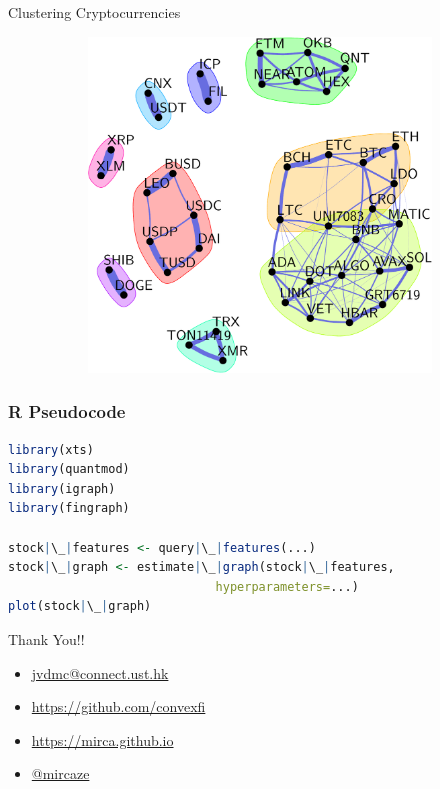 \documentclass[aspectratio=169]{beamer}
\begin{document}
\begin{frame}{Clustering Cryptocurrencies}
  \pause
    \vspace{.75cm}
    \begin{figure}[!htb]
    \captionsetup[subfigure]{justification=centering}
    \centering
    \begin{subfigure}[t]{0.99\textwidth}
        \centering
        \includegraphics[scale=0.38]{figures/crypto-45-crop.pdf}
    \end{subfigure}%
   \end{figure}
\end{frame}

\begin{frame}[fragile]
\frametitle{R Pseudocode}
\begin{lstlisting}[language=R]
library(xts)
library(quantmod)
library(igraph)
library(fingraph)

stock|\_|features <- query|\_|features(...)
stock|\_|graph <- estimate|\_|graph(stock|\_|features,
                             hyperparameters=...)
plot(stock|\_|graph)
\end{lstlisting}
\end{frame}

\begin{frame}{Thank You!!}
  \begin{itemize}
    \item {\Large{}} \url{jvdmc@connect.ust.hk}
    \item {\Large {}} \url{https://github.com/convexfi}
    \item {\Large {}} \url{https://mirca.github.io}
    \item {\Large {}} \url{@mircaze}
  \end{itemize}
\end{frame}
\end{document}
